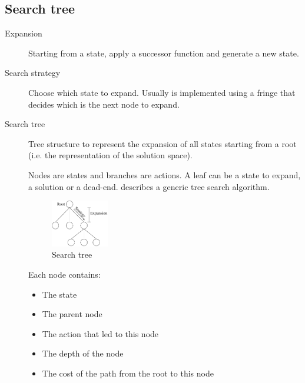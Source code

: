 \subsection{Search tree}
\begin{description}
    \item[Expansion] 
        Starting from a state, apply a successor function and generate a new state.

    \item[Search strategy] 
        Choose which state to expand. 
        Usually is implemented using a fringe that decides which is the next node to expand.

    \item[Search tree] 
        Tree structure to represent the expansion of all states starting from a root 
        (i.e. the representation of the solution space).

        Nodes are states and branches are actions.
        A leaf can be a state to expand, a solution or a dead-end.
         describes a generic tree search algorithm.

        \begin{figure}[h]
            \centering
            \includegraphics[width=0.25\textwidth]{img/_search_tree.pdf}
            \caption{Search tree}
        \end{figure}

        Each node contains:
        \begin{itemize}
            \item The state
            \item The parent node
            \item The action that led to this node
            \item The depth of the node
            \item The cost of the path from the root to this node
        \end{itemize}
\end{description}


